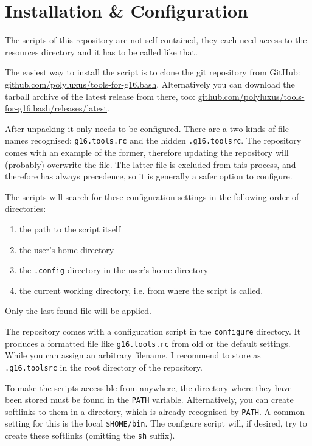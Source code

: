 \documentclass[   %
  final,          %
  a4paper         %
]{article}
\begin{document}
\section{Installation \& Configuration}
\label{sec:installation}

The scripts of this repository are not self-contained,
they each need access to the resources directory 
and it has to be called like that.

The easiest way to install the script is to clone the git repository from GitHub:\newline
\href{https://github.com/polyluxus/tools-for-g16.bash}{github.com/polyluxus/tools-for-g16.bash}.
Alternatively you can download the tarball archive of the latest release from there, too:\newline
\href{https://github.com/polyluxus/tools-for-g16.bash/releases/latest}{github.com/polyluxus/tools-for-g16.bash/releases/latest}.

After unpacking it only needs to be configured.
There are a two kinds of file names recognised:
\lstinline`g16.tools.rc` and the hidden \lstinline`.g16.toolsrc`.
The repository comes with an example of the former, 
therefore updating the repository will (probably) overwrite the file.
The latter file is excluded from this process,
and therefore has always precedence, 
so it is generally a safer option to configure.

The scripts will search for these configuration settings in the following order of directories:
\begin{enumerate}
  \item the path to the script itself 
  \item the user's home directory
  \item the \texttt{.config} directory in the user's home directory
  \item the current working directory, i.e. from where the script is called.
\end{enumerate}
Only the last found file will be applied.

The repository comes with a configuration script in the \texttt{configure} directory.
It produces a formatted file like \lstinline`g16.tools.rc` from old or the default settings.
While you can assign an arbitrary filename, 
I recommend to store as \lstinline`.g16.toolsrc` in the root directory of the repository.

To make the scripts accessible from anywhere, the directory where they have been stored
must be found in the \texttt{PATH} variable.
Alternatively, you can create softlinks to them in a directory, 
which is already recognised by \texttt{PATH}.
A common setting for this is the local \texttt{\$HOME/bin}.
The configure script will, if desired, try to create these softlinks (omitting the \texttt{sh} suffix).
\end{document}
